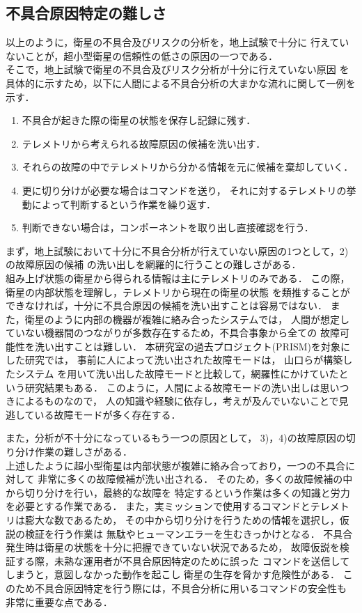\documentclass[11pt]{jsreport}
\begin{document}
\subsection{不具合原因特定の難しさ}
以上のように，衛星の不具合及びリスクの分析を，地上試験で十分に
行えていないことが，超小型衛星の信頼性の低さの原因の一つである．\\
そこで，地上試験で衛星の不具合及びリスク分析が十分に行えていない原因
を具体的に示すため，以下に人間による不具合分析の大まかな流れに関して一例を示す．
\begin{enumerate}[1)]
   \item 不具合が起きた際の衛星の状態を保存し記録に残す． 
   \item テレメトリから考えられる故障原因の候補を洗い出す．
   \item それらの故障の中でテレメトリから分かる情報を元に候補を棄却していく．
   \item 更に切り分けが必要な場合はコマンドを送り，
   それに対するテレメトリの挙動によって判断するという作業を繰り返す．
   \item 判断できない場合は，コンポーネントを取り出し直接確認を行う．
\end{enumerate}
まず，地上試験において十分に不具合分析が行えていない原因の1つとして，2)の故障原因の候補
の洗い出しを網羅的に行うことの難しさがある．\\
組み上げ状態の衛星から得られる情報は主にテレメトリのみである．
この際，衛星の内部状態を理解し，テレメトリから現在の衛星の状態
を類推することができなければ，十分に不具合原因の候補を洗い出すことは容易ではない．
また，衛星のように内部の機器が複雑に絡み合ったシステムでは，
人間が想定していない機器間のつながりが多数存在するため，不具合事象から全ての
故障可能性を洗い出すことは難しい．
本研究室の過去プロジェクト(PRISM)を対象にした研究では，
事前に人によって洗い出された故障モードは，%
山口ら\cite{Yamaguchi2014}が構築したシステム
を用いて洗い出した故障モードと比較して，網羅性にかけていたという研究結果もある．
このように，人間による故障モードの洗い出しは思いつきによるものなので，
人の知識や経験に依存し，考えが及んでいないことで見逃している故障モードが多く存在する．

また，分析が不十分になっているもう一つの原因として，
3)，4)の故障原因の切り分け作業の難しさがある．\\
上述したように超小型衛星は内部状態が複雑に絡み合っており，一つの不具合に対して
非常に多くの故障候補が洗い出される．
そのため，多くの故障候補の中から切り分けを行い，最終的な故障を
特定するという作業は多くの知識と労力を必要とする作業である．
また，実ミッションで使用するコマンドとテレメトリは膨大な数であるため，
その中から切り分けを行うための情報を選択し，仮説の検証を行う作業は
無駄やヒューマンエラーを生むきっかけとなる．
不具合発生時は衛星の状態を十分に把握できていない状況であるため，
故障仮説を検証する際，未熟な運用者が不具合原因特定のために誤った%
コマンドを送信してしまうと，意図しなかった動作を起こし
衛星の生存を脅かす危険性がある．
このため不具合原因特定を行う際には，不具合分析に用いるコマンドの安全性も
非常に重要な点である．
\end{document}
